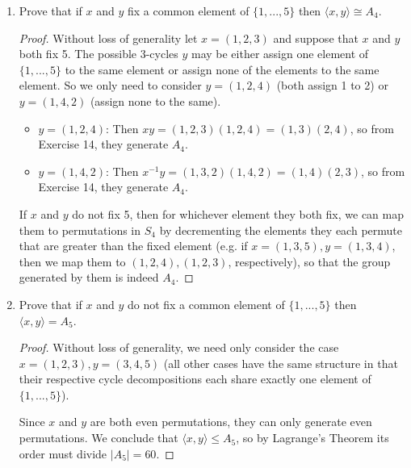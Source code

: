\documentclass{article}
\begin{document}
\begin{enumerate}[label=(\alph*), itemsep=0em]
    \item Prove that if $x$ and $y$ fix a common element of $\{ 1, ..., 5 \}$ then $\langle x, y \rangle \cong A_4$.
          \begin{proof}
            Without loss of generality let $x = (1, 2, 3)$ and suppose that $x$ and $y$ both fix 5. The possible 3-cycles $y$ may be either assign one element of $\{ 1, ..., 5 \}$ to the same element or assign none of the elements to the same element. So we only need to consider $y = (1, 2, 4)$ (both assign 1 to 2) or $y = (1, 4, 2)$ (assign none to the same).
            \begin{itemize}
                \item $y = (1, 2, 4)$: Then $xy = (1, 2, 3)(1, 2, 4) = (1, 3)(2, 4)$, so from Exercise 14, they generate $A_4$.
                \item $y = (1, 4, 2)$: Then $x^{-1} y = (1, 3, 2)(1, 4, 2) = (1, 4)(2, 3)$, so from Exercise 14, they generate $A_4$.
            \end{itemize}
            If $x$ and $y$ do not fix 5, then for whichever element they both fix, we can map them to permutations in $S_4$ by decrementing the elements they each permute that are greater than the fixed element (e.g. if $x = (1, 3, 5), y = (1, 3, 4)$, then we map them to $(1, 2, 4), (1, 2, 3)$, respectively), so that the group generated by them is indeed $A_4$.
          \end{proof}
    \item Prove that if $x$ and $y$ do not fix a common element of $\{ 1, ..., 5 \}$ then $\langle x, y \rangle = A_5$.
          \begin{proof}
            Without loss of generality, we need only consider the case $x = (1, 2, 3), y = (3, 4, 5)$ (all other cases have the same structure in that their respective cycle decompositions each share exactly one element of $\{ 1, ..., 5 \}$).

            Since $x$ and $y$ are both even permutations, they can only generate even permutations. We conclude that $\langle x, y \rangle \leq A_5$, so by Lagrange's Theorem its order must divide $|A_5| = 60$.


\end{proof}
\end{enumerate}
\end{document}
